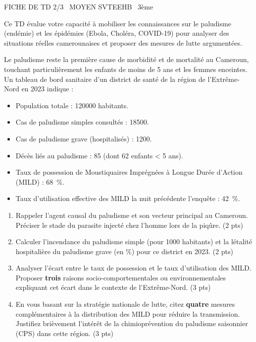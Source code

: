 \documentclass[11pt]{article}
\begin{document}
\begin{tcolorbox}[enhanced,colback=popink,colframe=popink,arc=10pt,boxrule=0pt,left=12pt,right=12pt,top=9pt,bottom=9pt]
{\color{white}\popxbold\small FICHE DE TD 2/3 \textbullet\ MOYEN \hfill SVTEEHB \textbullet\ 3ème\par}
\end{tcolorbox}
\vspace{4pt}
Ce TD évalue votre capacité à mobiliser les connaissances sur le paludisme (endémie) et les épidémies (Ebola, Choléra, COVID-19) pour analyser des situations réelles camerounaises et proposer des mesures de lutte argumentées.

\begin{exercice}
Le paludisme reste la première cause de morbidité et de mortalité au Cameroun, touchant particulièrement les enfants de moins de 5 ans et les femmes enceintes. Un tableau de bord sanitaire d'un district de santé de la région de l'Extrême-Nord en 2023 indique :
\begin{itemize}
    \item Population totale : \num{120000} habitants.
    \item Cas de paludisme simples consultés : \num{18500}.
    \item Cas de paludisme grave (hospitalisés) : \num{1200}.
    \item Décès liés au paludisme : \num{85} (dont \num{62} enfants < 5 ans).
    \item Taux de possession de Moustiquaires Imprégnées à Longue Durée d'Action (MILD) : \SI{68}{\%}.
    \item Taux d'utilisation effective des MILD la nuit précédente l'enquête : \SI{42}{\%}.
\end{itemize}
\begin{enumerate}
    \item Rappeler l'agent causal du paludisme et son vecteur principal au Cameroun. Préciser le stade du parasite injecté chez l'homme lors de la piqûre. (2 pts)
    \item Calculer l'incendance du paludisme simple (pour 1000 habitants) et la létalité hospitalière du paludisme grave (en \%) pour ce district en 2023. (2 pts)
    \item Analyser l'écart entre le taux de possession et le taux d'utilisation des MILD. Proposer \textbf{trois} raisons socio-comportementales ou environnementales expliquant cet écart dans le contexte de l'Extrême-Nord. (3 pts)
    \item En vous basant sur la stratégie nationale de lutte, citez \textbf{quatre} mesures complémentaires à la distribution des MILD pour réduire la transmission. Justifiez brièvement l'intérêt de la chimioprévention du paludisme saisonnier (CPS) dans cette région. (3 pts)
\end{enumerate}
\end{exercice}
\end{document}
